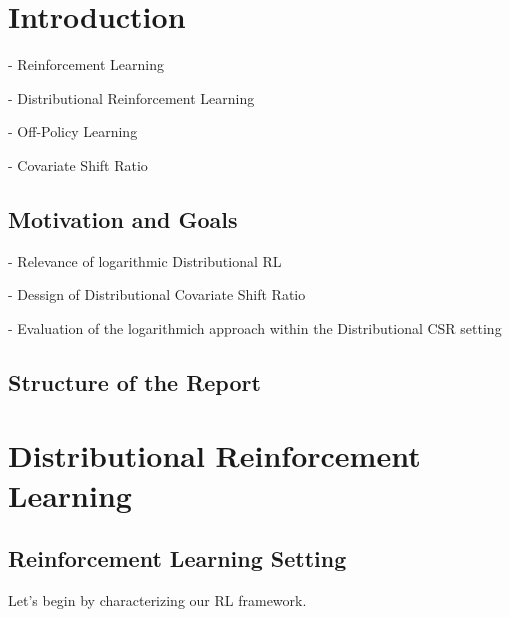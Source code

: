 \documentclass[12pt,a4paper,openright,twoside]{article}
\numberwithin{equation}{section}
\theoremstyle{definition}
\theoremstyle{remark}
\theoremstyle{plain}
\begin{document}
\setcounter{page}{1}

\thispagestyle{plain}
\section{Introduction}

- Reinforcement Learning

- Distributional Reinforcement Learning

- Off-Policy Learning

- Covariate Shift Ratio




\subsection*{Motivation and Goals}

- Relevance of logarithmic Distributional RL

- Dessign of Distributional Covariate Shift Ratio

- Evaluation of the logarithmich approach within the Distributional CSR setting


\subsection*{Structure of the Report}




\newpage


\thispagestyle{plain}
\section{Distributional Reinforcement Learning}




\subsection{Reinforcement Learning Setting}

Let's begin by characterizing our RL framework.
\end{document}
